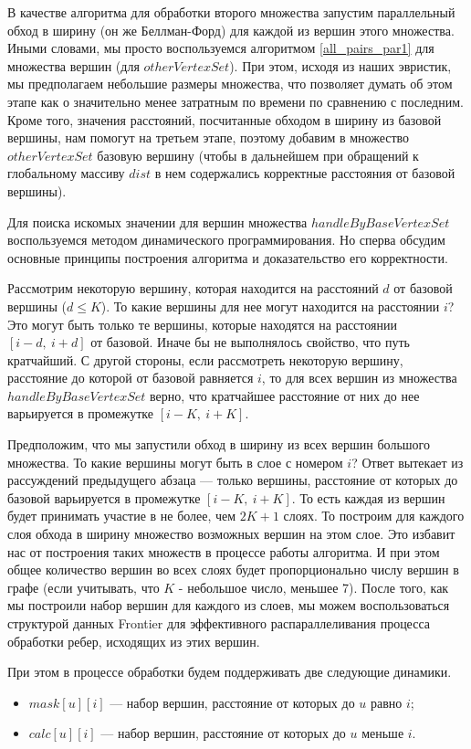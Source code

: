 В качестве алгоритма для обработки второго множества запустим параллельный обход в ширину (он же Беллман-Форд) для каждой из вершин этого множества. Иными словами, мы просто воспользуемся алгоритмом \ref{all_pairs_par1} для множества вершин (для $otherVertexSet$). При этом, исходя из наших эвристик, мы предполагаем небольшие размеры множества, что позволяет думать об этом этапе как о значительно менее затратным по времени по сравнению с последним. Кроме того, значения расстояний, посчитанные обходом в ширину из базовой вершины, нам помогут на третьем этапе, поэтому добавим в множество $otherVertexSet$ базовую вершину (чтобы в дальнейшем при обращений к глобальному массиву $dist$ в нем содержались корректные расстояния от базовой вершины).

Для поиска искомых значении для вершин множества $handleByBaseVertexSet$ воспользуемся методом динамического программирования. Но сперва обсудим основные принципы построения алгоритма и доказательство его корректности. 

Рассмотрим некоторую вершину, которая находится на расстояний $d$ от базовой вершины ($d \leq K$). То какие вершины для нее могут находится на расстоянии $i$? Это могут быть только те вершины, которые находятся на расстоянии $[i-d, \ i+d]$ от базовой. Иначе бы не выполнялось свойство, что путь кратчайший. С другой стороны, если рассмотреть некоторую вершину, расстояние до которой от базовой равняется $i$, то для всех вершин из множества $handleByBaseVertexSet$ верно, что кратчайшее расстояние от них до нее варьируется в промежутке $[i-K, \ i+K]$. 

 Предположим, что мы запустили обход в ширину из всех вершин большого множества. То какие вершины могут быть в слое с номером $i$? Ответ вытекает из рассуждений предыдущего абзаца --- только вершины, расстояние от которых до базовой варьируется в промежутке $[i-K, \ i+K]$. То есть каждая из вершин будет принимать участие в не более, чем $2K+1$ слоях. То построим для каждого слоя обхода в ширину множество возможных вершин на этом слое. Это избавит нас от построения таких множеств в процессе работы алгоритма. И при этом общее количество вершин во всех слоях будет пропорционально числу вершин в графе (если учитывать, что $K$ - небольшое число, меньшее 7). После того, как мы построили набор вершин для каждого из слоев, мы можем воспользоваться структурой данных Frontier для эффективного распараллеливания процесса обработки ребер, исходящих из этих вершин.
 
  При этом в процессе обработки будем поддерживать две следующие динамики.  
 \begin{itemize}
  \item $mask[u][i]$ --- набор вершин, расстояние от которых до $u$ равно $i$;
  \item $calc[u][i]$ --- набор вершин, расстояние от которых до $u$ меньше $i$.
\end{itemize}

